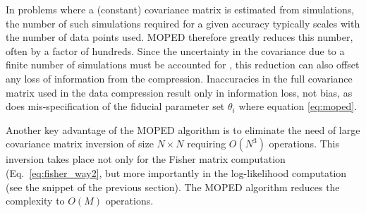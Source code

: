 \documentclass[twocolumn,twocolappendix,nofootinbib,iop]{openjournal}
\newcommand{\FrL}[1]{{\color{cyan}FL: #1}}
\begin{document}
In problems where a (constant) covariance matrix is estimated from simulations, the number of such simulations required for a given accuracy typically scales with the number of data points used. 
MOPED therefore greatly reduces this number, often by a factor of hundreds. Since the uncertainty in the covariance due to a finite number of simulations must be accounted for \citep{2018MNRAS.473.2355S,2007A&A...464..399H}, this reduction can also offset any loss of information from the compression. Inaccuracies in the full covariance matrix used in the data compression result only in information loss, not bias, as does mis-specification of the fiducial parameter set $\theta_i$ where equation \ref{eq:moped}.



Another key advantage of the MOPED algorithm is to eliminate the need of large covariance matrix inversion of size $N\times N$ requiring $O(N^3)$ operations. This inversion takes place not only for the Fisher matrix computation (Eq.~\ref{eq:fisher_way2}, but more importantly in the log-likelihood computation (see the snippet of the previous section). The MOPED algorithm reduces the complexity to $O(M)$ operations.
\end{document}
